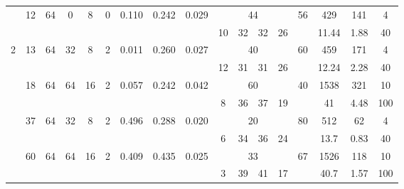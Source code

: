\begin{landscape}
\begin{savenotes}
\begin{longtable}{ccccccccccccccccc}
\cmidrule{2-17} %

 & \multirow{2}{*}{12} & \multirow{2}{*}{64} & \multirow{2}{*}{0} & \multirow{2}{*}{8} & \multirow{2}{*}{0} & \multirow{2}{*}{0.110} & \multirow{2}{*}{0.242} & \multirow{2}{*}{0.029} & \multicolumn{4}{c}{44} & \multirow{2}{*}{56} & 429 & 141 & 4 \\
\cmidrule{10-13}
 & &  &  &  &  &  &  &  & 10 & 32 & 32 & 26 &  & 11.44 & 1.88 & 40 \\





\midrule \midrule

\multirow{5}{*}{2} &

  \multirow{2}{*}{13} & \multirow{2}{*}{64} & \multirow{2}{*}{32} & \multirow{2}{*}{8} & \multirow{2}{*}{2} & \multirow{2}{*}{0.011} & \multirow{2}{*}{0.260} & \multirow{2}{*}{0.027} & \multicolumn{4}{c}{40} & \multirow{2}{*}{60} & 459 & 171 & 4 \\
\cmidrule{10-13}
 & &  &  &  &  &  &  &  & 12 & 31 & 31 & 26 &  & 12.24 & 2.28 & 40 \\

 \cmidrule{2-17} %

 & \multirow{2}{*}{18} & \multirow{2}{*}{64} & \multirow{2}{*}{64} & \multirow{2}{*}{16} & \multirow{2}{*}{2} & \multirow{2}{*}{0.057} & \multirow{2}{*}{0.242} & \multirow{2}{*}{0.042} & \multicolumn{4}{c}{60} & \multirow{2}{*}{40} & 1538 & 321 & 10 \\
\cmidrule{10-13}
 & &  &  &  &  &  &  &  & 8 & 36 & 37 & 19 &  & 41 & 4.48 & 100 \\





\midrule \midrule

\multirow{5}{*}{0} &

  \multirow{2}{*}{37} & \multirow{2}{*}{64} & \multirow{2}{*}{32} & \multirow{2}{*}{8} & \multirow{2}{*}{2} & \multirow{2}{*}{0.496} & \multirow{2}{*}{0.288} & \multirow{2}{*}{0.020} & \multicolumn{4}{c}{20} & \multirow{2}{*}{80} & 512 & 62 & 4 \\
\cmidrule{10-13}
 & &  &  &  &  &  &  &  & 6 & 34 & 36 & 24 &  & 13.7 & 0.83 & 40 \\

 \cmidrule{2-17} %

 & \multirow{2}{*}{60} & \multirow{2}{*}{64} & \multirow{2}{*}{64} & \multirow{2}{*}{16} & \multirow{2}{*}{2} & \multirow{2}{*}{0.409} & \multirow{2}{*}{0.435} & \multirow{2}{*}{0.025} & \multicolumn{4}{c}{33} & \multirow{2}{*}{67} & 1526 & 118 & 10 \\
\cmidrule{10-13}
 & &  &  &  &  &  &  &  & 3 & 39 & 41 & 17 &  & 40.7 & 1.57 & 100 \\




\end{longtable}
\end{savenotes}
\end{landscape}
